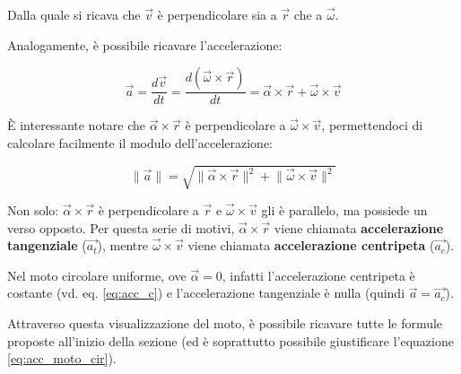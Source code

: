 \documentclass[oneside]{book}
\newcommand{\norm}[1]{\lVert \vec{#1} \rVert}
\newcommand{\nnorm}[1]{\lVert #1 \rVert}
\begin{document}
Dalla quale si ricava che $\vec{v}$ è perpendicolare sia a $\vec{r}$ che
a $\vec{\omega}$.

Analogamente, è possibile ricavare l'accelerazione:

\begin{equation}
    \vec{a}=\frac{d\vec{v}}{dt}=\frac{d(\vec{\omega}
    \times \vec{r})}{dt}=\vec{\alpha} \times \vec{r}
    + \vec{\omega} \times \vec{v}
\end{equation}

È interessante notare che $\vec{\alpha} \times \vec{r}$
è perpendicolare a $\vec{\omega} \times \vec{v}$, permettendoci
di calcolare facilmente il modulo dell'accelerazione:

\begin{equation}
    \norm{a} = \sqrt{\nnorm{\vec{\alpha} \times \vec{r}}^2 + \nnorm{\vec{\omega} \times \vec{v}}^2}
\end{equation}

Non solo: $\vec{\alpha} \times \vec{r}$ è perpendicolare a $\vec{r}$ e
$\vec{\omega} \times \vec{v}$ gli è parallelo, ma possiede un verso opposto.
Per questa serie di motivi, $\vec{\alpha} \times \vec{r}$ viene chiamata
\textbf{accelerazione tangenziale} ($\vec{a_t}$), mentre
$\vec{\omega} \times \vec{v}$ viene chiamata \textbf{accelerazione centripeta}
($\vec{a_c}$).

Nel moto circolare uniforme, ove $\vec{\alpha}=0$, infatti l'accelerazione
centripeta è costante (vd. eq. \ref{eq:acc_c}) e l'accelerazione
tangenziale è nulla (quindi $\vec{a}=\vec{a_c}$).

Attraverso questa visualizzazione del moto, è possibile ricavare tutte
le formule proposte all'inizio della sezione (ed è soprattutto
possibile giustificare l'equazione \ref{eq:acc_moto_cir}).
\end{document}
